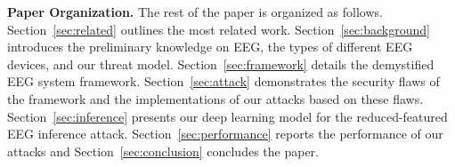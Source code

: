 \indent \textbf{Paper Organization.} The rest of the paper is organized as follows. Section~\ref{sec:related} outlines the most related work. Section~\ref{sec:background} introduces the preliminary knowledge on EEG, the types of different EEG devices, and our threat model. Section~\ref{sec:framework} details the demystified EEG system framework. Section~\ref{sec:attack} demonstrates the security flaws of the framework and the implementations of our attacks based on these flaws. Section~\ref{sec:inference} presents our deep learning model for the reduced-featured EEG inference attack. Section~\ref{sec:performance} reports the performance of our attacks and Section~\ref{sec:conclusion} concludes the paper.


